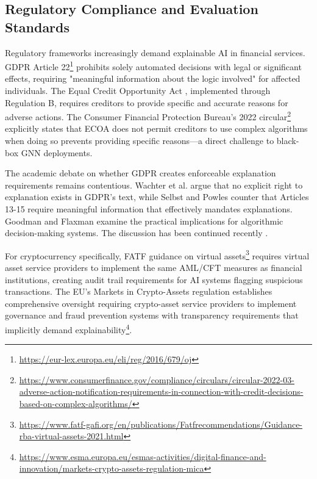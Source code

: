 \subsection{Regulatory Compliance and Evaluation Standards}

Regulatory frameworks increasingly demand explainable AI in financial services. GDPR Article 22\footnote{\url{https://eur-lex.europa.eu/eli/reg/2016/679/oj}} prohibits solely automated decisions with legal or significant effects, requiring "meaningful information about the logic involved" for affected individuals. The Equal Credit Opportunity Act \citep{ecoa1974}, implemented through Regulation B, requires creditors to provide specific and accurate reasons for adverse actions. The Consumer Financial Protection Bureau's 2022 circular\footnote{\url{https://www.consumerfinance.gov/compliance/circulars/circular-2022-03-adverse-action-notification-requirements-in-connection-with-credit-decisions-based-on-complex-algorithms/}} explicitly states that ECOA does not permit creditors to use complex algorithms when doing so prevents providing specific reasons—a direct challenge to black-box GNN deployments.

The academic debate on whether GDPR creates enforceable explanation requirements remains contentious. Wachter et al. \citep{wachter2017righttoexplanation} argue that no explicit right to explanation exists in GDPR's text, while Selbst and Powles \citep{selbst2017meaningful} counter that Articles 13-15 require meaningful information that effectively mandates explanations. Goodman and Flaxman \citep{goodman2016explanation} examine the practical implications for algorithmic decision-making systems. The discussion has been continued recently \citep{sargeant2026mind}.

For cryptocurrency specifically, FATF guidance on virtual assets\footnote{\url{https://www.fatf-gafi.org/en/publications/Fatfrecommendations/Guidance-rba-virtual-assets-2021.html}} requires virtual asset service providers to implement the same AML/CFT measures as financial institutions, creating audit trail requirements for AI systems flagging suspicious transactions. The EU's Markets in Crypto-Assets regulation \citep{teng2026digital} establishes comprehensive oversight requiring crypto-asset service providers to implement governance and fraud prevention systems with transparency requirements that implicitly demand explainability\footnote{\url{https://www.esma.europa.eu/esmas-activities/digital-finance-and-innovation/markets-crypto-assets-regulation-mica}}.


